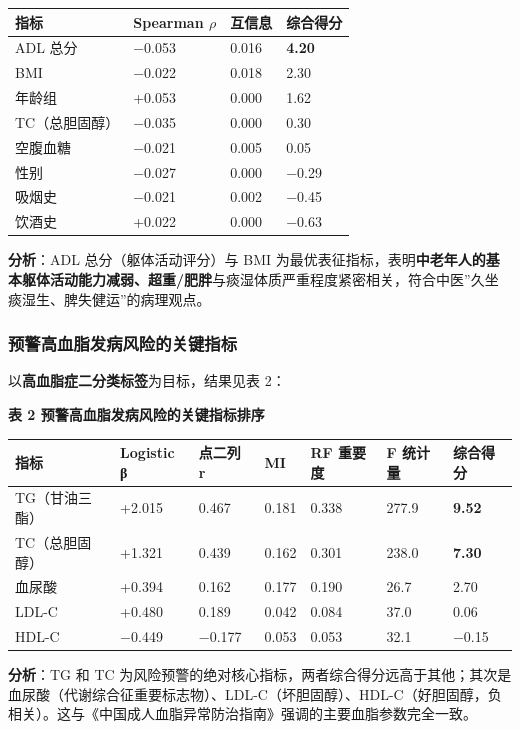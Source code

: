 \documentclass{MathorCupmodeling}
\begin{document}
\begin{longtable}[]{@{}llll@{}}
\toprule\noalign{}
指标 & Spearman \(\rho\) & 互信息 & 综合得分 \\
\midrule\noalign{}
\endhead
\bottomrule\noalign{}
\endlastfoot
ADL 总分 & −0.053 & 0.016 & \textbf{4.20} \\
BMI & −0.022 & 0.018 & 2.30 \\
年龄组 & +0.053 & 0.000 & 1.62 \\
TC（总胆固醇） & −0.035 & 0.000 & 0.30 \\
空腹血糖 & −0.021 & 0.005 & 0.05 \\
性别 & −0.027 & 0.000 & −0.29 \\
吸烟史 & −0.021 & 0.002 & −0.45 \\
饮酒史 & +0.022 & 0.000 & −0.63 \\
\end{longtable}

\textbf{分析}：ADL 总分（躯体活动评分）与 BMI 为最优表征指标，表明\textbf{中老年人的基本躯体活动能力减弱、超重/肥胖}与痰湿体质严重程度紧密相关，符合中医''久坐痰湿生、脾失健运''的病理观点。

\subsubsection{预警高血脂发病风险的关键指标}\label{ux9884ux8b66ux9ad8ux8840ux8102ux53d1ux75c5ux98ceux9669ux7684ux5173ux952eux6307ux6807}

以\textbf{高血脂症二分类标签}为目标，结果见表 2：

\textbf{表 2 预警高血脂发病风险的关键指标排序}

\begin{longtable}[]{@{}lllllll@{}}
\toprule\noalign{}
指标 & Logistic β & 点二列 r & MI & RF 重要度 & F 统计量 & 综合得分 \\
\midrule\noalign{}
\endhead
\bottomrule\noalign{}
\endlastfoot
TG（甘油三酯） & +2.015 & 0.467 & 0.181 & 0.338 & 277.9 & \textbf{9.52} \\
TC（总胆固醇） & +1.321 & 0.439 & 0.162 & 0.301 & 238.0 & \textbf{7.30} \\
血尿酸 & +0.394 & 0.162 & 0.177 & 0.190 & 26.7 & 2.70 \\
LDL-C & +0.480 & 0.189 & 0.042 & 0.084 & 37.0 & 0.06 \\
HDL-C & −0.449 & −0.177 & 0.053 & 0.053 & 32.1 & −0.15 \\
\end{longtable}

\textbf{分析}：TG 和 TC 为风险预警的绝对核心指标，两者综合得分远高于其他；其次是血尿酸（代谢综合征重要标志物）、LDL-C（坏胆固醇）、HDL-C（好胆固醇，负相关）。这与《中国成人血脂异常防治指南》强调的主要血脂参数完全一致。
\end{document}
